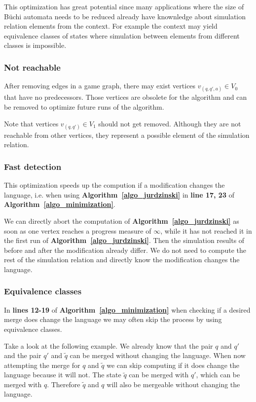 \documentclass[12pt,oneside,bibliography=totoc,abstracton]{scrartcl}
\newcommand{\algoref}[1]{\textbf{Algorithm~\ref{#1}}}
\begin{document}
This optimization has great potential since many applications where the size of Büchi automata needs to be
reduced already have knownledge about simulation relation elements from the context.
For example the context may yield equivalence classes of states where simulation
between elements from different classes is impossible.

\subsubsection*{Not reachable}
After removing edges in a game graph, there may exist vertices $v_{(q, q', a)} \in V_0$ that have no predecessors.
Those vertices are obsolete for the algorithm and can be removed to optimize future runs of the algorithm.

Note that vertices $v_{(q, q')} \in V_1$ should not get removed. Although they are not reachable from other
vertices, they represent a possible element of the simulation relation.

\subsubsection*{Fast detection}
This optimization speeds up the compution if a modification changes the language,
i.e. when using \algoref{algo_jurdzinski} in \textbf{line 17, 23} of \algoref{algo_minimization}.

We can directly abort the computation of \algoref{algo_jurdzinski} as soon as one vertex
reaches a progress measure of $\infty$, while it has not reached it in the first run of \algoref{algo_jurdzinski}.
Then the simulation results of before and after the modification already differ.
We do not need to compute the rest of the simulation relation and directly know the modification changes the language.

\subsubsection*{Equivalence classes}
In \textbf{lines 12-19} of \algoref{algo_minimization} when checking if a desired merge does change
the language we may often skip the process by using equivalence classes.

Take a look at the following example. We already know that the pair $q$ and $q'$ and the
pair $q'$ and $\tilde{q}$ can be merged without changing the language.
When now attempting the merge for $q$ and $\tilde{q}$ we can skip computing if it does change
the language because it will not. The state $\tilde{q}$ can be merged with $q'$, which can be merged with
$q$. Therefore $\tilde{q}$ and $q$ will also be mergeable without changing the language.
\end{document}
